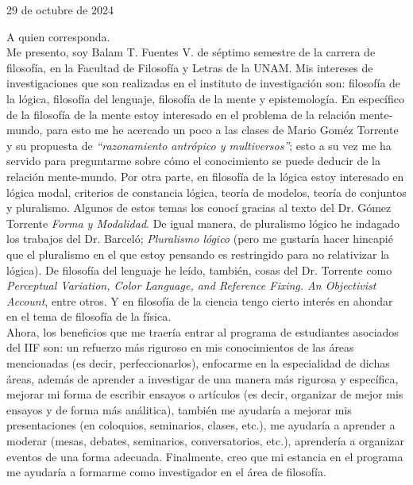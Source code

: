 \documentclass{article}
\begin{document}
\begin{flushright}
    29 de octubre de 2024
\end{flushright}
\noindent A quien corresponda. 
\vspace{5pt} \\ 
\noindent Me presento, soy Balam T. Fuentes V. de séptimo semestre 
de la carrera de filosofía, en la Facultad de Filosofía y Letras de la 
UNAM. Mis intereses de investigaciones que son realizadas en el instituto 
de investigación son: filosofía de la lógica, filosofía del lenguaje, 
filosofía de la mente y epistemología. En específico de la filosofía de la 
mente estoy interesado en el problema de la relación mente-mundo, 
para esto me he acercado un poco a las clases de Mario Goméz Torrente
y su propuesta de \textit{``razonamiento antrópico y multiversos''};
esto a su vez me ha servido para preguntarme sobre cómo el conocimiento 
se puede deducir de la relación mente-mundo.
Por otra parte, en filosofía de la lógica estoy interesado en lógica modal,
criterios de constancia lógica, teoría de modelos, teoría de conjuntos y pluralismo. 
Algunos de estos temas los conocí gracias al texto del Dr. Gómez Torrente  
\textit{Forma y Modalidad}. De igual manera, de pluralismo lógico he
indagado los trabajos del Dr. Barceló; \textit{Pluralismo lógico} (pero 
me gustaría hacer hincapié que el pluralismo en el que estoy pensando 
es restringido para no relativizar la lógica). De filosofía del lenguaje 
he leído, también, cosas del Dr. Torrente como \textit{Perceptual Variation, 
Color Language, and Reference Fixing. An Objectivist Account}, entre otros. 
Y en filosofía de la ciencia tengo cierto interés en ahondar en el tema 
de filosofía de la física. 
\vspace{5pt} \\ 
\noindent Ahora, los beneficios que me traería entrar al programa de 
estudiantes asociados del IIF son: un refuerzo más riguroso en mis 
conocimientos de las áreas mencionadas (es decir, perfeccionarlos), 
enfocarme en la especialidad de dichas áreas, además de aprender a 
investigar de una manera más rigurosa y específica, mejorar mi 
forma de escribir ensayos o artículos (es decir, organizar de mejor 
mis ensayos y de forma más análitica), también me ayudaría a mejorar 
mis presentaciones (en coloquios, seminarios, clases, etc.), 
me ayudaría a aprender a moderar (mesas, debates, seminarios, 
conversatorios, etc.), aprendería a organizar eventos de 
una forma adecuada. Finalmente, creo que mi estancia en el programa me 
ayudaría a formarme como investigador en el área de filosofía.
\end{document}

